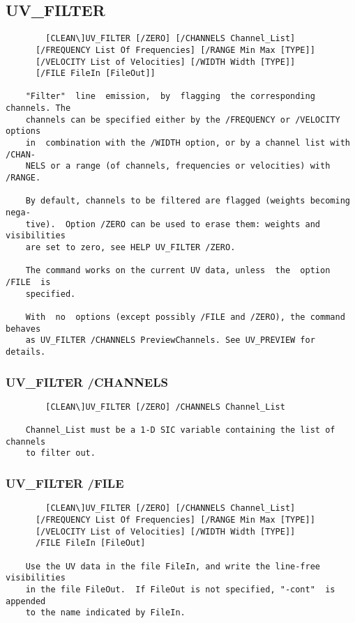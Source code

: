 \subsection{UV\_FILTER}
\begin{verbatim}
        [CLEAN\]UV_FILTER [/ZERO] [/CHANNELS Channel_List]
      [/FREQUENCY List Of Frequencies] [/RANGE Min Max [TYPE]]
      [/VELOCITY List of Velocities] [/WIDTH Width [TYPE]]
      [/FILE FileIn [FileOut]]

    "Filter"  line  emission,  by  flagging  the corresponding channels. The
    channels can be specified either by the /FREQUENCY or /VELOCITY  options
    in  combination with the /WIDTH option, or by a channel list with /CHAN-
    NELS or a range (of channels, frequencies or velocities) with /RANGE.

    By default, channels to be filtered are flagged (weights becoming  nega-
    tive).  Option /ZERO can be used to erase them: weights and visibilities
    are set to zero, see HELP UV_FILTER /ZERO.

    The command works on the current UV data, unless  the  option  /FILE  is
    specified.

    With  no  options (except possibly /FILE and /ZERO), the command behaves
    as UV_FILTER /CHANNELS PreviewChannels. See UV_PREVIEW for details.

\end{verbatim}
\subsubsection{UV\_FILTER /CHANNELS}
\begin{verbatim}
        [CLEAN\]UV_FILTER [/ZERO] /CHANNELS Channel_List

    Channel_List must be a 1-D SIC variable containing the list of  channels
    to filter out.

\end{verbatim}
\subsubsection{UV\_FILTER /FILE}
\begin{verbatim}
        [CLEAN\]UV_FILTER [/ZERO] [/CHANNELS Channel_List]
      [/FREQUENCY List Of Frequencies] [/RANGE Min Max [TYPE]]
      [/VELOCITY List of Velocities] [/WIDTH Width [TYPE]]
      /FILE FileIn [FileOut]

    Use the UV data in the file FileIn, and write the line-free visibilities
    in the file FileOut.  If FileOut is not specified, "-cont"  is  appended
    to the name indicated by FileIn.

\end{verbatim}
